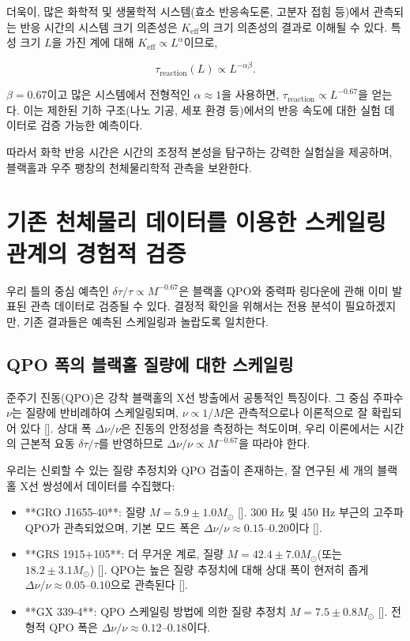 \documentclass[12pt,a4paper]{article}
\newcommand{\Keff}{K_{\mathrm{eff}}}
\begin{document}
	더욱이, 많은 화학적 및 생물학적 시스템(효소 반응속도론, 고분자 접힘 등)에서 관측되는 반응 시간의 시스템 크기 의존성은 \(\Keff\)의 크기 의존성의 결과로 이해될 수 있다. 특성 크기 \(L\)을 가진 계에 대해 \(\Keff \propto L^{\alpha}\)이므로,
	
	\begin{equation}
		\tau_{\mathrm{reaction}}(L) \propto L^{-\alpha\beta}.
	\end{equation}
	
	\(\beta = 0.67\)이고 많은 시스템에서 전형적인 \(\alpha \approx 1\)을 사용하면, \(\tau_{\mathrm{reaction}} \propto L^{-0.67}\)을 얻는다. 이는 제한된 기하 구조(나노 기공, 세포 환경 등)에서의 반응 속도에 대한 실험 데이터로 검증 가능한 예측이다.
	
	따라서 화학 반응 시간은 시간의 조정적 본성을 탐구하는 강력한 실험실을 제공하며, 블랙홀과 우주 팽창의 천체물리학적 관측을 보완한다.
	
	\section{기존 천체물리 데이터를 이용한 스케일링 관계의 경험적 검증}
	\label{sec:empirical_test}
	
	우리 틀의 중심 예측인 \(\delta\tau/\tau \propto M^{-0.67}\)은 블랙홀 QPO와 중력파 링다운에 관해 이미 발표된 관측 데이터로 검증될 수 있다. 결정적 확인을 위해서는 전용 분석이 필요하겠지만, 기존 결과들은 예측된 스케일링과 놀랍도록 일치한다.
	
	\subsection{QPO 폭의 블랙홀 질량에 대한 스케일링}
	
	준주기 진동(QPO)은 강착 블랙홀의 X선 방출에서 공통적인 특징이다. 그 중심 주파수 \(\nu\)는 질량에 반비례하여 스케일링되며, \(\nu \propto 1/M\)은 관측적으로나 이론적으로 잘 확립되어 있다 [\cite{Wagoner2001, Schnittman2004}]. 상대 폭 \(\Delta\nu/\nu\)은 진동의 안정성을 측정하는 척도이며, 우리 이론에서는 시간의 근본적 요동 \(\delta\tau/\tau\)를 반영하므로 \(\Delta\nu/\nu \propto M^{-0.67}\)을 따라야 한다.
	
	우리는 신뢰할 수 있는 질량 추정치와 QPO 검출이 존재하는, 잘 연구된 세 개의 블랙홀 X선 쌍성에서 데이터를 수집했다:
	
	\begin{itemize}
		\item **GRO J1655-40**: 질량 \(M = 5.9 \pm 1.0 M_\odot\) [\cite{Wagoner2001}]. 300 Hz 및 450 Hz 부근의 고주파 QPO가 관측되었으며, 기본 모드 폭은 \(\Delta\nu/\nu \approx 0.15\)–\(0.20\)이다 [\cite{Strohmayer2001a, Wagoner2001}].
		\item **GRS 1915+105**: 더 무거운 계로, 질량 \(M = 42.4 \pm 7.0 M_\odot\)(또는 \(18.2 \pm 3.1 M_\odot\)) [\cite{Wagoner2001}]. QPO는 높은 질량 추정치에 대해 상대 폭이 현저히 좁게 \(\Delta\nu/\nu \approx 0.05\)–\(0.10\)으로 관측된다 [\cite{Strohmayer2001b}].
		\item **GX 339-4**: QPO 스케일링 방법에 의한 질량 추정치 \(M = 7.5 \pm 0.8 M_\odot\) [\cite{Chen2011}]. 전형적 QPO 폭은 \(\Delta\nu/\nu \approx 0.12\)–\(0.18\)이다.
	\end{itemize}
	
\end{document}
